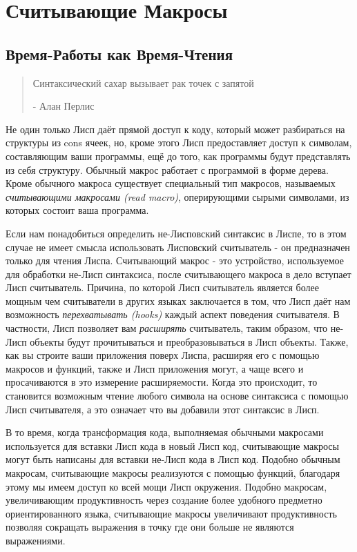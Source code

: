 \chapter{Считывающие Макросы}\label{chapter_reading_macros}
\section{Время-Работы как Время-Чтения}\label{section_run-time_at_read-time}

\begin{quote}
Синтаксический сахар вызывает рак точек с запятой

- Алан Перлис
\end{quote}

Не один только Лисп даёт прямой доступ к коду, который может разбираться на структуры из cons ячеек, но, кроме этого Лисп предоставляет доступ к символам, составляющим ваши программы, ещё до того, как программы будут представлять из себя структуру. Обычный макрос работает с программой в форме дерева. Кроме обычного макроса существует специальный тип макросов, называемых \emph{считывающими макросами (read macro)}, оперирующими сырыми символами, из которых состоит ваша программа.

Если нам понадобиться определить не-Лисповский синтаксис в Лиспе, то в этом случае не имеет смысла использовать Лисповский считыватель - он предназначен только для чтения Лиспа. Считывающий макрос - это устройство, используемое для обработки не-Лисп синтаксиса, после считывающего макроса в дело вступает Лисп считыватель. Причина, по которой Лисп считыватель является более мощным чем считыватели в других языках заключается в том, что Лисп даёт нам возможность \emph{перехватывать (hooks)} каждый аспект поведения считывателя. В частности, Лисп позволяет вам \emph{расширять} считыватель, таким образом, что не-Лисп объекты будут прочитываться и преобразовываться в Лисп объекты. Также, как вы строите ваши приложения поверх Лиспа, расширяя его с помощью макросов и функций, также и Лисп приложения могут, а чаще всего и просачиваются в это измерение расширяемости. Когда это происходит, то становится возможным чтение любого символа на основе синтаксиса с помощью Лисп считывателя, а это означает что вы добавили этот синтаксис в Лисп.

В то время, когда трансформация кода, выполняемая обычными макросами используется для вставки Лисп кода в новый Лисп код, считывающие макросы могут быть написаны для вставки не-Лисп кода в Лисп код. Подобно обычным макросам, считывающие макросы реализуются с помощью функций, благодаря этому мы имеем доступ ко всей мощи Лисп окружения. Подобно макросам, увеличивающим продуктивность через создание более удобного предметно ориентированного языка, считывающие макросы увеличивают продуктивность позволяя сокращать выражения в точку где они больше не являются выражениями.

